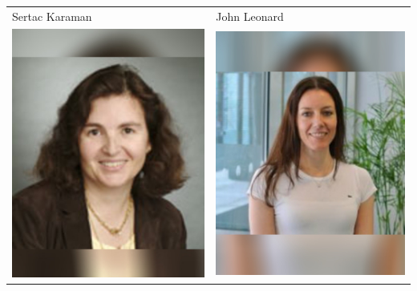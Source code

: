 \documentclass[landscape,a0paper,fontscale=0.292]{baposter}
\begin{document}
\begin{poster}
{\begin{center}
\begin{tabularx}{\linewidth}{X X}
{\tiny \centering Sertac Karaman }& {\tiny \centering John Leonard }\\ 
 {\centering \includegraphics[width=0.85\linewidth]{rus.jpg}}&
{\centering \includegraphics[width=0.85\linewidth]{delvecchio.jpg}}\\ 


\end{tabularx}
\end{center}}
\end{poster}
\end{document}
